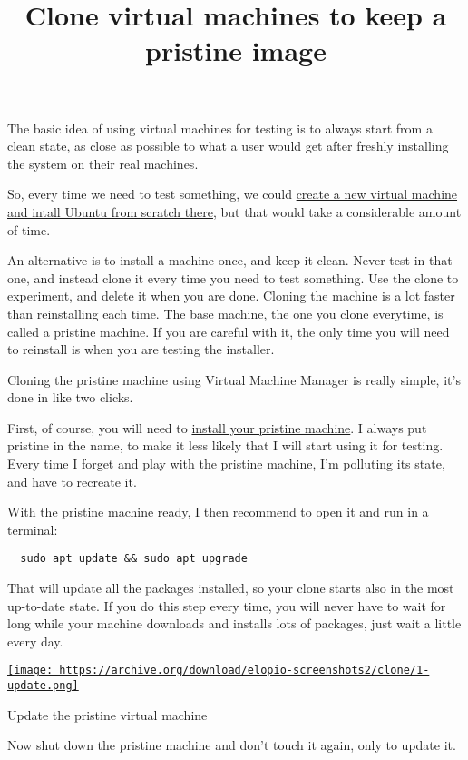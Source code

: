 \documentclass[12pt]{article}
\title{Clone virtual machines to keep a pristine image}
\begin{document}
The basic idea of using virtual machines for testing is to always start from a
clean state, as close as possible to what a user would get after freshly
installing the system on their real machines.

So, every time we need to test something, we could
\href{http://elopio.net/blog/install-ubuntu-in-vm/}
     {create a new virtual machine and intall Ubuntu from scratch there},
but that would take a considerable amount of time.

An alternative is to install a machine once, and keep it clean. Never test in
that one, and instead clone it every time you need to test something. Use the
clone to experiment, and delete it when you are done. Cloning the machine is
a lot faster than reinstalling each time. The base machine, the one you
clone everytime, is called a pristine machine. If you are careful with it, the
only time you will need to reinstall is when you are testing the installer.

Cloning the pristine machine using Virtual Machine Manager is really simple,
it's done in like two clicks.

First, of course, you will need to
\href{http://elopio.net/blog/install-ubuntu-in-vm/}
     {install your pristine machine}.
I always put pristine in the name, to make it less likely that I will start
using it for testing. Every time I forget and play with the pristine machine,
I'm polluting its state, and have to recreate it.

With the pristine machine ready, I then recommend to open it and run in a
terminal:

\begin{verbatim}
  sudo apt update && sudo apt upgrade
\end{verbatim}

That will update all the packages installed, so your clone starts also in the
most up-to-date state. If you do this step every time, you will never have to
wait for long while your machine downloads and installs lots of packages, just
wait a little every day.

\begin{center}
  \href{
    https://archive.org/download/elopio-screenshots2/clone/1-update.png}{
    \texttt{[image: 
    https://archive.org/download/elopio-screenshots2/clone/1-update.png]}
  }
  \caption{Update the pristine virtual machine}
\end{center}

Now shut down the pristine machine and don't touch it again, only to update it.
\end{document}
